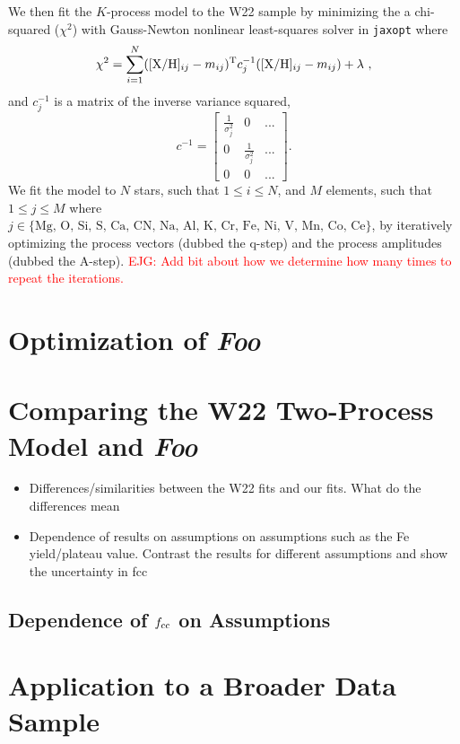 \documentclass[modern]{aastex631}
\newcommand{\fcc}{f_{\rm cc}}
\newcommand{\xh}{[{\rm X}/{\rm H}]}
\newcommand{\ejg}[1]{\textcolor{red}{EJG: #1}}
\newcommand{\name}{\textsl{Foo}} %
\begin{document}
We then fit the $K$-process model to the W22 sample by minimizing the a chi-squared ($\chi^2$) with Gauss-Newton nonlinear least-squares solver in \texttt{jaxopt} where
\begin{equation}
    \chi^2 = \sum_{i=1}^{N} (\xh_{ij} - m_{ij})^{\rm T} c_j^{-1} (\xh_{ij} - m_{ij}) + \lambda~,
\end{equation}
and $c_j^{-1}$ is a matrix of the inverse variance squared,
\begin{equation}
    c^{-1} = \begin{bmatrix}
\frac{1}{\sigma_j^2} & 0 & ...\\
0 & \frac{1}{\sigma_j^2} & ... \\
0 & 0 & ... 
\end{bmatrix} .
\end{equation}
We fit the model to $N$ stars, such that $1 \leq i \leq N$, and $M$ elements, such that $1 \leq j \leq M$ where $j \in \{ \text{Mg, O, Si, S, Ca, CN, Na, Al, K, Cr, Fe, Ni, V, Mn, Co, Ce} \}$, by iteratively optimizing the process vectors (dubbed the q-step) and the process amplitudes (dubbed the A-step). \ejg{Add bit about how we determine how many times to repeat the iterations.}

\section{Optimization of \name} \label{sec:optimize}

\section{Comparing the W22 Two-Process Model and \name} \label{sec:results_W22}

\begin{itemize}
    \item Differences/similarities between the W22 fits and our fits. What do the differences mean
    \item Dependence of results on assumptions on assumptions such as the Fe yield/plateau value. Contrast the results for different assumptions and show the uncertainty in fcc 
\end{itemize}

\subsection{Dependence of $\fcc$ on Assumptions} \label{subsec:fcc}

\section{Application to a Broader Data Sample} \label{sec:results_broad}
\end{document}
